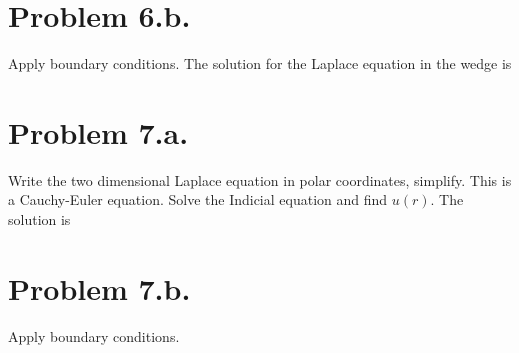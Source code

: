 \documentclass{article}
\begin{document}
\section*{Problem 6.b.}
Apply boundary conditions.
The solution for the Laplace equation in the wedge is
\section*{Problem 7.a.}
Write the two dimensional Laplace equation in polar coordinates, simplify.
This is a Cauchy-Euler equation. Solve the Indicial equation and find $u(r)$.
The solution is
\section*{Problem 7.b.}
Apply boundary conditions.
\end{document}

